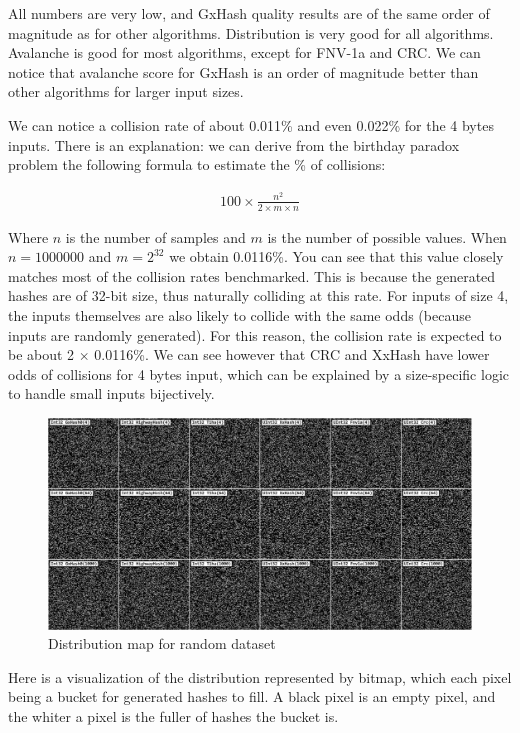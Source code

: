 \documentclass[10pt]{article}
\begin{document}
All numbers are very low, and GxHash quality results are of the same order of magnitude as for other algorithms. Distribution is very good for all algorithms. Avalanche is good for most algorithms, except for FNV-1a and CRC. We can notice that avalanche score for GxHash is an order of magnitude better than other algorithms for larger input sizes.

We can notice a collision rate of about 0.011\% and even 0.022\% for the 4 bytes inputs. There is an explanation: we can derive from the birthday paradox problem the following formula to estimate the \% of collisions:

\begin{align*}
    100 \times \frac{n^2}{2 \times m \times n}
\end{align*}

Where \(n\) is the number of samples and \(m\) is the number of possible values. When \(n=1000000\) and \(m=2^{32}\) we obtain 0.0116\%.
You can see that this value closely matches most of the collision rates benchmarked. This is because the generated hashes are of 32-bit size,
thus naturally colliding at this rate. For inputs of size 4, the inputs themselves are also likely to collide with the same odds (because inputs are randomly generated). For this reason, the collision rate is expected to be about 2 \(\times\) 0.0116\%.
We can see however that CRC and XxHash\cite{xxhash} have lower odds of collisions for 4 bytes input, which can be explained by a size-specific logic to handle small inputs bijectively.

\begin{figure}[H]
\centering
\includegraphics[width=1\textwidth]{quality-random.png}
\caption{Distribution map for random dataset}
\label{fig:quality-random}
\end{figure}

Here is a visualization of the distribution represented by bitmap, which each pixel being a bucket for generated hashes to fill. A black pixel is an empty pixel, and the whiter a pixel is the fuller of hashes the bucket is. 
\end{document}
